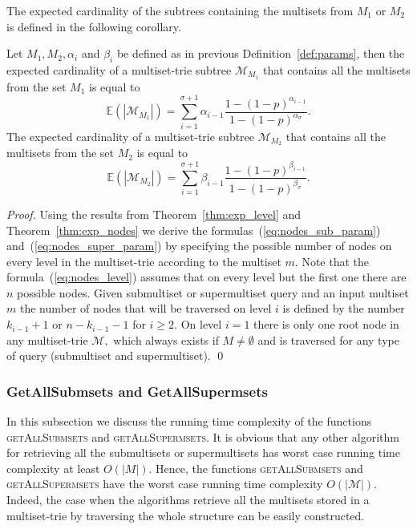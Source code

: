 The expected cardinality of the subtrees containing the multisets from $M_1$ or $M_2$ 
is defined in the following corollary.

\begin{corollary}\label{cor:exp_nodes_param}
Let $M_1, M_2, \alpha_i$ and $\beta_i$ be defined as in previous Definition~\ref{def:params}, 
then the expected cardinality of a multiset-trie subtree $\mathcal{M}_{M_1}$ that contains all the multisets 
from the set $M_1$ is equal to 
\begin{equation}\label{eq:nodes_sub_param}
\mathbb{E}( |\mathcal{M}_{M_1}| ) = \sum_{i=1}^{\sigma + 1} \alpha_{i-1} \frac{1-(1-p)^{\alpha_{i-1}}}{1-(1-p)^{\alpha_{\sigma}}}.
\end{equation}
The expected cardinality of a multiset-trie subtree $\mathcal{M}_{M_2}$ that contains all the multisets 
from the set $M_2$ is equal to 
\begin{equation}\label{eq:nodes_super_param}
\mathbb{E}( |\mathcal{M}_{M_2}| ) = \sum_{i=1}^{\sigma + 1} \beta_{i-1} \frac{1-(1-p)^{\beta_{i-1}}}{1-(1-p)^{\beta_{\sigma}}}.
\end{equation}
\end{corollary}
%
\begin{proof}
Using the results from Theorem~\ref{thm:exp_level} and Theorem~\ref{thm:exp_nodes} 
we derive the formulas~(\ref{eq:nodes_sub_param}) and~(\ref{eq:nodes_super_param}) 
by specifying the possible number of nodes on every level in the multiset-trie according 
to the multiset $m.$ Note that the formula~(\ref{eq:nodes_level}) assumes that on every 
level but the first one there are $n$ possible nodes. Given submultiset or supermultiset 
query and an input multiset $m$ the number of nodes that will be traversed on level $i$ is 
defined by the number $k_{i-1}+1$ or $n-k_{i-1}-1$ for $i\geq 2.$ On level $i=1$ 
there is only one root node in any multiset-trie $\mathcal{M},$ which always exists 
if $M\neq\emptyset$ and is traversed for any type of query (submultiset and 
supermultiset).
\hspace*{\fill}\qed
\end{proof}

\subsubsection{GetAllSubmsets and GetAllSupermsets}\label{ss:getall}
In this subsection we discuss the running time complexity of the functions 
\textsc{getAllSubmsets} and \textsc{getAllSupermsets}. It is obvious that any 
other algorithm for retrieving all the submultisets or supermultisets has worst 
case running time complexity at least $O(|M|).$ Hence, the functions 
\textsc{getAllSubmsets} and \textsc{getAllSupermsets} have the worst case 
running time complexity $O(|\mathcal{M}|).$ Indeed, the case when the algorithms 
retrieve all the multisets stored in a multiset-trie by traversing the whole structure 
can be easily constructed. 

